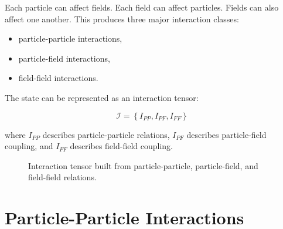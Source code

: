 \documentclass[11pt]{article}
\begin{document}
Each particle can affect fields. Each field can affect particles. Fields can also affect one another. This produces three major interaction classes:

\begin{itemize}[leftmargin=1.2cm]
  \item particle-particle interactions,
  \item particle-field interactions,
  \item field-field interactions.
\end{itemize}

The state can be represented as an interaction tensor:

\[
\mathcal{I} =
\left\{
I_{PP}, I_{PF}, I_{FF}
\right\}
\]

where \(I_{PP}\) describes particle-particle relations, \(I_{PF}\) describes particle-field coupling, and \(I_{FF}\) describes field-field coupling.

\begin{figure}[H]
\centering
{}
\caption{Interaction tensor built from particle-particle, particle-field, and field-field relations.}
\end{figure}

\section{Particle-Particle Interactions}
\end{document}
